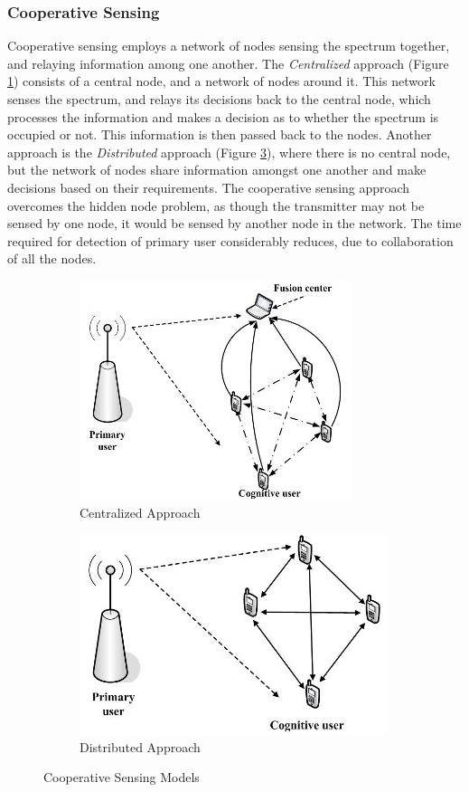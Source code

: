 \subsubsection{Cooperative Sensing}
Cooperative sensing employs a network of nodes sensing the spectrum together,
and relaying information among one another. The \textit{Centralized} approach
(Figure \ref{fig:coopfc_model}) consists of a central node, and a network of
nodes around it. This network senses the spectrum, and relays its decisions back to the central node, which processes the information and makes a decision as to whether the spectrum is
occupied or not. This information is then passed back to the nodes. Another
approach is the \textit{Distributed} approach (Figure \ref{fig:coop_model}),
where there is no central node, but the network of nodes share information amongst one another and make
decisions based on their requirements. The cooperative sensing approach
overcomes the hidden node problem, as though the transmitter may not be sensed
by one node, it would be sensed by another node in the network. The time
required for detection of primary user considerably reduces, due to
collaboration of all the nodes.

\begin{figure}[h]
	\centering
	\begin{subfigure}{0.45\textwidth}
		\includegraphics[keepaspectratio,scale=0.7]{images/cooperativefc_model.PNG}
		\caption{Centralized Approach}
		\label{fig:coopfc_model}
	\end{subfigure}
	\hfill
	\begin{subfigure}{0.45\textwidth}
		\includegraphics[keepaspectratio,scale=0.7]{images/cooperative_model.PNG}
		\caption{Distributed Approach}
		\label{fig:coop_model}
	\end{subfigure}
	\caption{Cooperative Sensing Models \cite{wang}}
\end{figure}

